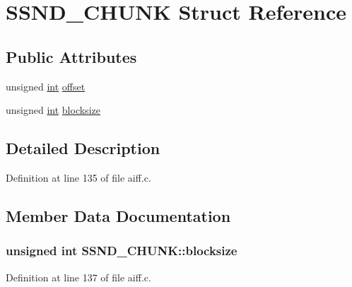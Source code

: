 \hypertarget{struct_s_s_n_d___c_h_u_n_k}{}\section{S\+S\+N\+D\+\_\+\+C\+H\+U\+NK Struct Reference}
\label{struct_s_s_n_d___c_h_u_n_k}
\subsection*{Public Attributes}
\begin{DoxyCompactItemize}
\item 
unsigned \hyperlink{xmltok_8h_a5a0d4a5641ce434f1d23533f2b2e6653}{int} \hyperlink{struct_s_s_n_d___c_h_u_n_k_a8f02ade90ed73ecf75f44dc4a7d924e9}{offset}
\item 
unsigned \hyperlink{xmltok_8h_a5a0d4a5641ce434f1d23533f2b2e6653}{int} \hyperlink{struct_s_s_n_d___c_h_u_n_k_aaed2535cfdb77e2d8d7b0f6dc76f90a3}{blocksize}
\end{DoxyCompactItemize}


\subsection{Detailed Description}


Definition at line 135 of file aiff.\+c.



\subsection{Member Data Documentation}
\subsubsection[{\texorpdfstring{blocksize}{blocksize}}]{\setlength{\rightskip}{0pt plus 5cm}unsigned {\bf int} S\+S\+N\+D\+\_\+\+C\+H\+U\+N\+K\+::blocksize}\hypertarget{struct_s_s_n_d___c_h_u_n_k_aaed2535cfdb77e2d8d7b0f6dc76f90a3}{}\label{struct_s_s_n_d___c_h_u_n_k_aaed2535cfdb77e2d8d7b0f6dc76f90a3}


Definition at line 137 of file aiff.\+c.

